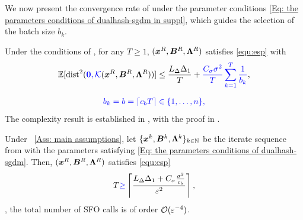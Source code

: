 We now present the convergence rate of  under the parameter conditions \eqref{Eq: the parameters conditions of dualhash-sgdm in suppl}, which guides the selection of the batch size $b_k$.
\begin{lemma}
\label{lemma: convergence rate sgdm} Under the conditions of , for any $T \geq 1$,
     $(\bm{x}^{R}, \bm{B}
    ^{R}, \bm{\Lambda}^{R})$ satisfies \eqref{equ:esp} with
    \begin{align}
        \label{Eq: the convergence rate of sgdm}\mathbb{E}[\mathrm{dist}^{2}(\blue{\bm{0}, \mathcal K}(\bx^{R}, \bB^{R}, \bLmbd^{R}))] \leq \frac{L_{\Delta}\Delta_{1}}{T}+ \blue{\frac{C_{\sigma}\sigma^{2}}{T}\sum_{k=1}^{T}\frac{1}{b_{k}}},
    \end{align}
\end{lemma}
\begin{align}
\label{Eq: the parameters conditions of dualhash-sgdm}
    \blue{b_k=b=\lceil c_bT\rceil\in\{1,\ldots,n\},}
\end{align}
 The complexity result is established in , with the proof in .
\begin{theorem}
    \label{Theorem: the oracle complexity in SGDM}
Under ~\ref{Ass: main assumptions}, let \(\{\bm{x}^k, \bm{B}^k, \bm{\Lambda}^k\}_{k \in \mathbb{N}}\) be the iterate sequence from  with the parameters satisfying  \eqref{Eq: the parameters conditions of dualhash-sgdm}. Then,  \( (\bm{x}^R, \bm{B}^R, \bm{\Lambda}^R )\) satisfies \eqref{equ:esp} 
\begin{align}
    \label{Eq: the iterate number upper bound of algorithm SGDM}
        T \blue{\geq} \left\lceil \frac{L_{\Delta} \Delta_1+ C_{\sigma}\frac{\sigma^2}{c_b}}{\varepsilon^2} \right\rceil,
\end{align}
 , the total number of SFO calls is of order \(\mathcal{O}(\varepsilon^{-4})\).
\end{theorem}
